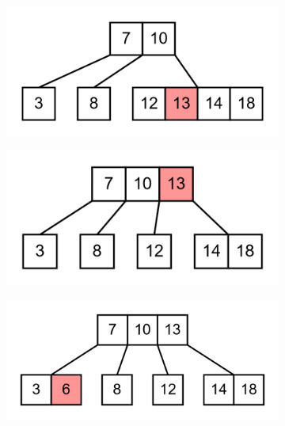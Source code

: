 \documentclass[11pt,a4paper]{article}
\begin{document}
\begin{loesung}
\begin{enumerate}
\begin{figure}[h!]
\begin{subfigure}[b]{0.31\textwidth}
            \end{subfigure}
            \begin{subfigure}[b]{0.31\textwidth}
                \centering
                \includegraphics[scale=0.15]{img/3d/10}
            \end{subfigure}
            \begin{subfigure}[b]{0.31\textwidth}
                \centering
                \includegraphics[scale=0.15]{img/3d/11}
            \end{subfigure}
            \begin{subfigure}[b]{0.31\textwidth}
                \centering
                \includegraphics[scale=0.15]{img/3d/12}
            \end{subfigure}

\end{figure}
\end{enumerate}
\end{loesung}
\end{document}
